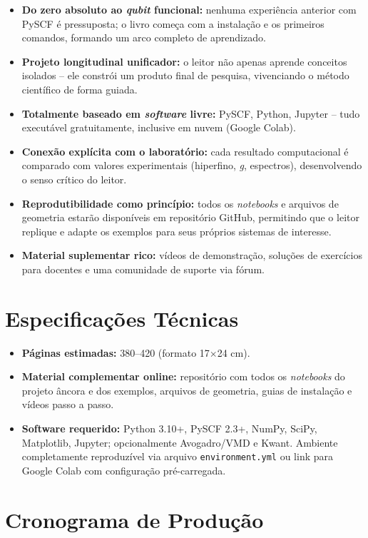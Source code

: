 \documentclass[12pt,a4paper]{article}
\begin{document}
	\begin{itemize}
		\item \textbf{Do zero absoluto ao \emph{qubit} funcional:} nenhuma experiência anterior com PySCF é pressuposta; o livro começa com a instalação e os primeiros comandos, formando um arco completo de aprendizado.
		\item \textbf{Projeto longitudinal unificador:} o leitor não apenas aprende conceitos isolados -- ele constrói um produto final de pesquisa, vivenciando o método científico de forma guiada.
		\item \textbf{Totalmente baseado em \emph{software} livre:} PySCF, Python, Jupyter -- tudo executável gratuitamente, inclusive em nuvem (Google Colab).
		\item \textbf{Conexão explícita com o laboratório:} cada resultado computacional é comparado com valores experimentais (hiperfino, \emph{g}, espectros), desenvolvendo o senso crítico do leitor.
		\item \textbf{Reprodutibilidade como princípio:} todos os \emph{notebooks} e arquivos de geometria estarão disponíveis em repositório GitHub, permitindo que o leitor replique e adapte os exemplos para seus próprios sistemas de interesse.
		\item \textbf{Material suplementar rico:} vídeos de demonstração, soluções de exercícios para docentes e uma comunidade de suporte via fórum.
	\end{itemize}
	
	\section{Especificações Técnicas}
	
	\begin{itemize}
		\item \textbf{Páginas estimadas:} 380--420 (formato 17$\times$24 cm).
		\item \textbf{Material complementar online:} repositório com todos os \emph{notebooks} do projeto âncora e dos exemplos, arquivos de geometria, guias de instalação e vídeos passo a passo.
		\item \textbf{Software requerido:} Python 3.10+, PySCF 2.3+, NumPy, SciPy, Matplotlib, Jupyter; opcionalmente Avogadro/VMD e Kwant. Ambiente completamente reproduzível via arquivo \texttt{environment.yml} ou link para Google Colab com configuração pré-carregada.
	\end{itemize}
	
	\section{Cronograma de Produção}
	
\end{document}
